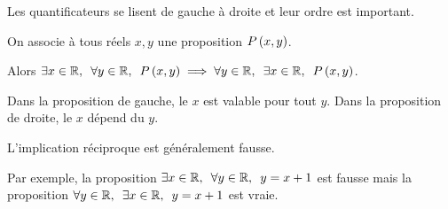 \begin{rem}
Les quantificateurs se lisent de gauche à droite et leur ordre est important.
\end{rem}

\begin{ex}
On associe à tous réels \(x,y\) une proposition \(P\left(x,y\right)\).

Alors \(\quantifs{\exists x\in\R;\forall y\in\R}P\paren{x,y}\imp\quantifs{\forall y\in\R;\exists x\in\R}P\paren{x,y}\).

Dans la proposition de gauche, le \(x\) est valable pour tout \(y\). Dans la proposition de droite, le \(x\) dépend du \(y\).

L'implication réciproque est généralement fausse.

Par exemple, la proposition \(\quantifs{\exists x\in\R;\forall y\in\R}y=x+1\) est fausse mais la proposition \(\quantifs{\forall y\in\R;\exists x\in\R}y=x+1\) est vraie.
\end{ex}


